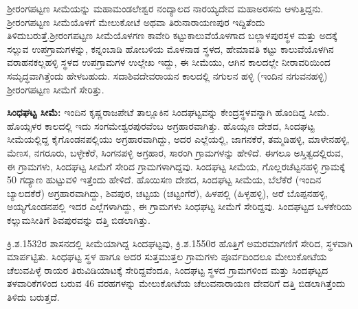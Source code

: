 \vskip 2pt

ಶ‍್ರೀರಂಗಪಟ್ಟಣ ಸೀಮೆಯನ್ನು ಮಹಾಮಂಡಲೇಶ್ವರ ನಂದ್ಯಾಲದ ನಾರಯ್ಯದೇವ ಮಹಾಅರಸನು ಆಳುತ್ತಿದ್ದನು. ಶ‍್ರೀರಂಗಪಟ್ಟಣ ಸೀಮೆಯೊಳಗೆ ಮೇಲುಕೋಟೆ ಅಥವಾ ತಿರುನಾರಾಯಣಪುರ ಇದ್ದಿತೆಂದು ತಿಳಿದುಬರುತ್ತೆ.\break ಶ‍್ರೀರಂಗಪಟ್ಟಣ ಸೀಮೆಯೊಳಗಣ ಕಾವೇರಿ ಕಟ್ಟುಕಾಲುವೆಯೊಳಗಾದ ಬಲ್ಲಾಳಪುರಸ್ಥಳ ಮತ್ತು ಅದಕ್ಕೆ ಸಲ್ಲುವ ಉಪಗ್ರಾಮ\-ಗಳನ್ನು, ಕನ್ನಂಬಾಡಿ ಹೋಬಳಿಯ ಮೊಳನಾಡ ಸ್ಥಳದ, ಹೇಮಾವತಿ ಕಟ್ಟು ಕಾಲುವೆಯೊಳಗಿನ ವರಾಹನಕಲ್ಲಹಳ್ಳಿ ಸ್ಥಳದ ಉಪಗ್ರಾಮ\-ಗಳ ಉಲ್ಲೇಖ ಇದ್ದು, ಈ ಸೀಮೆಯು, ಆಗಿನ ಕಾಲದಲ್ಲೇ ನೀರಾವರಿಯಿಂದ ಸಮೃದ್ಧವಾಗಿತ್ತೆಂದು ಹೇಳ\-ಬಹುದು. ಸದಾಶಿವದೇವರಾಯನ ಕಾಲದಲ್ಲಿ ನಗುಲನ ಹಳ್ಳಿ (ಇಂದಿನ ನಗುವನಹಳ್ಳಿ) ಶ‍್ರೀರಂಗಪಟ್ಟಣ ಸೀಮೆಗೆ ಸೇರಿತ್ತು.

\vskip 2pt

\textbf{ಸಿಂಧಘಟ್ಟ ಸೀಮೆ:} ಇಂದಿನ ಕೃಷ್ಣರಾಜಪೇಟೆ ತಾಲ್ಲೂಕಿನ ಸಿಂದಘಟ್ಟವನ್ನು ಕೇಂದ್ರಸ್ಥಳವನ್ನಾಗಿ ಹೊಂದಿದ್ದ ಸೀಮೆ. ಹೊಯ್ಸಳರ ಕಾಲದಲ್ಲಿ ಇದು ಸಂಗಮೇಶ್ವರಪುರವೆಂಬ ಅಗ್ರಹಾರವಾಗಿತ್ತು. ಹೊಯ್ಸಣ ದೇಶದ, ಸಿಂದಘಟ್ಟ ಸೀಮೆಯಲ್ಲಿದ್ದ ಕೈಗೊಂಡನಪಲ್ಲಿಯು ಅಗ್ರಹಾರವಾಗಿದ್ದು, ಅದರ ಎಲ್ಲೆಯಲ್ಲಿ, ಜಾಗನಕೆರೆ, ತಮ್ಮಡಿಹಳ್ಳಿ, ಮಾಳೇನಹಳ್ಳಿ, ಮೆಣಸ, ನಗರೂರು, ಬಳ್ಳೇಕೆರೆ, ಸಿಂಗನಪಳ್ಳಿ ಅಗ್ರಹಾರ, ಸಾರಂಗಿ ಗ್ರಾಮಗಳನ್ನು ಹೇಳಿದೆ. ಈಗಲೂ ಅಸ್ತಿತ್ವದಲ್ಲಿರುವ, ಈ ಗ್ರಾಮಗಳು, ಸಿಂದಘಟ್ಟ ಸೀಮೆಗೆ ಸೇರಿದ ಗ್ರಾಮಗಳಾಗಿದ್ದವು. ಸಿಂದಘಟ್ಟ ಸೀಮೆಯ, ಗೊಲ್ಲರಚೆಟ್ಟನಹಳ್ಳಿ ಗ್ರಾಮಕ್ಕೆ 50 ಗದ್ಯಾಣ ಹುಟ್ಟುವಳಿ ಇತ್ತೆಂದು ಹೇಳಿದೆ. ಹೊಯಿಸಣ ದೇಶದ, ಸಿಂದಘಟ್ಟ ಸೀಮೆಯ, ಬೆಲೆಕೆರೆ (ಇಂದಿನ ಬ್ಯಾಲದಕೆರೆ) ಅಗ್ರಹಾರವಾಗಿದ್ದು, ಶಿವಪುರ, ಚಟ್ಟಯ (ಚಟ್ಟಂಗೆರೆ), ಹಿಳಪಲ್ಲಿ (ಹಿಳ್ಳಹಳ್ಳಿ), ಅರೆ ಬೊಪ್ಪನಹಳ್ಳಿ, ಅಯ್ಯಗೊಂಡನಪಲ್ಲಿ ಇದರ ಎಲ್ಲೆಗಳಾಗಿದ್ದು, ಈ ಗ್ರಾಮಗಳು ಸಿಂಧಘಟ್ಟ ಸೀಮೆಗೆ ಸೇರಿದ್ದವು. ಸಿಂದಘಟ್ಟದ ಒಳಕೇರಿಯ ಕಲ್ಲುಮಸೀತಿಗೆ ಶಿವಪುರವನ್ನು ದತ್ತಿ ಬಿಡಲಾಗಿತ್ತು.

\vskip 2pt

ಕ್ರಿ.ಶ.1532ರ ಶಾಸನದಲ್ಲಿ ಸೀಮೆಯಾಗಿದ್ದ ಸಿಂದಘಟ್ಟವು, ಕ್ರಿ.ಶ.1550ರ ಹೊತ್ತಿಗೆ ಅಮರಮಾಗಣಿಗೆ ಸೇರಿದ, ಸ್ಥಳವಾಗಿ ಮಾರ್ಪಟ್ಟಿತು. ಸಿಂಧಘಟ್ಟ ಸ್ಥಳ ಹಾಗೂ ಅದರ ಸುತ್ತಮುತ್ತಲ ಗ್ರಾಮಗಳು ಪೂರ್ವದಿಂದಲೂ ಮೇಲುಕೋಟೆಯ ಚೆಲುವಪಿಳ್ಳೆ ರಾಯರ ತಿರುವಿಡಿಯಾಟಕ್ಕೆ ಸೇರಿದ್ದವೆಂದೂ, ಸಿಂದಘಟ್ಟ ಸ್ಥಳದ ಗ್ರಾಮಗಳಿಂದ ಮತ್ತು ಸಿಂದಘಟ್ಟದ ತಳವಾರಿಕೆ\-ಗಳಿಂದ ಬರುವ 46 ವರಹಗಳನ್ನು ಮೇಲುಕೋಟೆಯ ಚೆಲುವನಾರಾಯಣ ದೇವರಿಗೆ ದತ್ತಿ ಬಿಡಲಾಗಿತ್ತೆಂದು ತಿಳಿದು ಬರುತ್ತದೆ.

